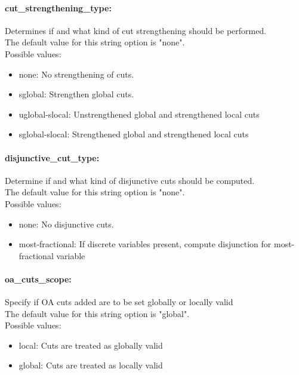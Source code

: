 \paragraph{cut\_strengthening\_type:}\label{sec:cut_strengthening_type} Determines if and what kind of cut strengthening should be performed. $\;$ \\
The default value for this string option is "none".
\\ 
Possible values:
\begin{itemize}
   \item none: No strengthening of cuts.
   \item sglobal: Strengthen global cuts.
   \item uglobal-slocal: Unstrengthened global and strengthened local
cuts
   \item sglobal-slocal: Strengthened global and strengthened local cuts
\end{itemize}

\paragraph{disjunctive\_cut\_type:}\label{sec:disjunctive_cut_type} Determine if and what kind of disjunctive cuts should be computed. $\;$ \\
The default value for this string option is "none".
\\ 
Possible values:
\begin{itemize}
   \item none: No disjunctive cuts.
   \item most-fractional: If discrete variables present, compute
disjunction for most-fractional variable
\end{itemize}

\paragraph{oa\_cuts\_scope:}\label{sec:oa_cuts_scope} Specify if OA cuts added are to be set globally or locally valid $\;$ \\
The default value for this string option is "global".
\\ 
Possible values:
\begin{itemize}
   \item local: Cuts are treated as globally valid
   \item global: Cuts are treated as locally valid
\end{itemize}


